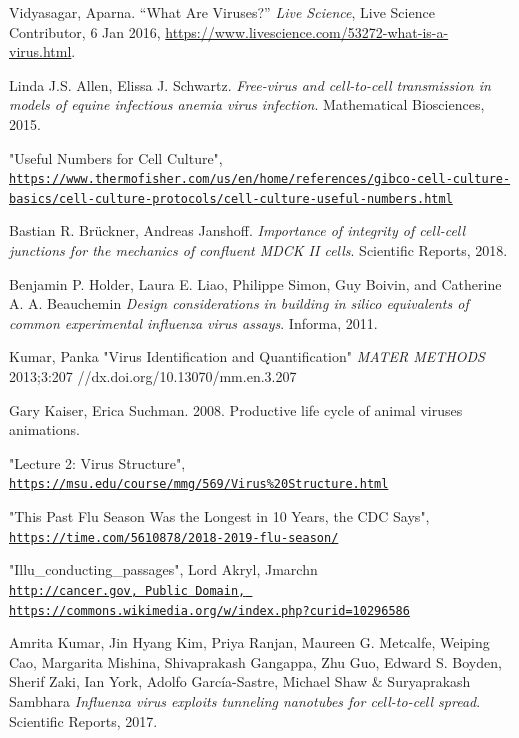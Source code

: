 \documentclass[a4paper]{article}
\begin{document}
\begin{thebibliography}{9}

Vidyasagar, Aparna. 
“What Are Viruses?”
\textit{Live Science}, 
Live Science Contributor, 6 Jan 2016, 
\url{https://www.livescience.com/53272-what-is-a-virus.html}.

Linda J.S. Allen, Elissa J. Schwartz. 
\textit{Free-virus and cell-to-cell transmission in models of equine infectious
anemia virus infection}. 
Mathematical Biosciences, 2015.

"Useful Numbers for Cell Culture",
\\
\texttt{\url{https://www.thermofisher.com/us/en/home/references/gibco-cell-culture-basics/cell-culture-protocols/cell-culture-useful-numbers.html}}

Bastian R. Br{\"u}ckner, Andreas Janshoff.
\textit{Importance of integrity of cell-cell junctions for the mechanics of confluent MDCK II cells}. 
Scientific Reports, 2018.

Benjamin P. Holder, Laura E. Liao, Philippe Simon, Guy Boivin, and Catherine A. A. Beauchemin
\textit{Design considerations in building in silico equivalents of common
experimental influenza virus assays}. 
Informa, 2011.

Kumar, Panka
"Virus Identification and Quantification"
\textit{MATER METHODS} 2013;3:207
//dx.doi.org/10.13070/mm.en.3.207

Gary Kaiser, Erica Suchman. 
2008. 
Productive life cycle of animal viruses animations. 

"Lecture 2: Virus Structure",
\\
\texttt{\url{https://msu.edu/course/mmg/569/Virus\%20Structure.html}}

"This Past Flu Season Was the Longest in 10 Years, the CDC Says",
\\
\texttt{\url{https://time.com/5610878/2018-2019-flu-season/}}

"Illu\_conducting\_passages",
Lord Akryl, Jmarchn
\\
\texttt{\url{http://cancer.gov, Public Domain, https://commons.wikimedia.org/w/index.php?curid=10296586}}

Amrita Kumar, Jin Hyang Kim, Priya Ranjan, Maureen G. Metcalfe, Weiping Cao,
Margarita Mishina, Shivaprakash Gangappa, Zhu Guo, Edward S. Boyden, Sherif Zaki,
Ian York, Adolfo García-Sastre, Michael Shaw \& Suryaprakash Sambhara
\textit{Influenza virus exploits tunneling nanotubes for cell-to-cell spread}. 
Scientific Reports, 2017.


\end{thebibliography}
\end{document}

